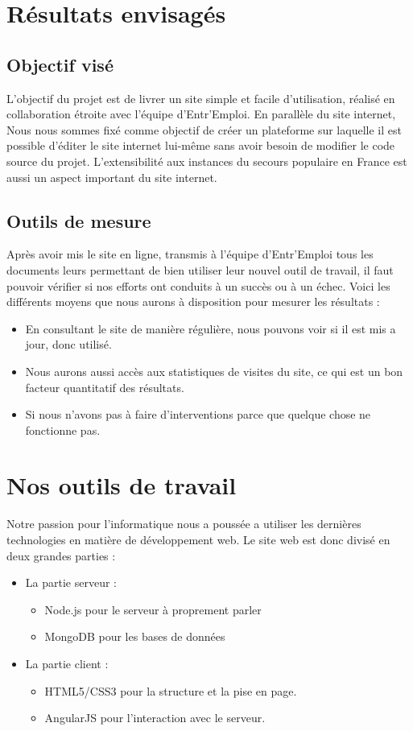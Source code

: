 \documentclass[a4paper, 12pt]{report}
\begin{document}
\chapter{Résultats envisagés}
\thispagestyle{fancy}

\section{Objectif visé}
L'objectif du projet est de livrer un site simple et facile d'utilisation, réalisé en collaboration étroite avec l'équipe d'Entr'Emploi.
En parallèle du site internet, Nous nous sommes fixé comme objectif de créer un plateforme sur laquelle il est possible d'éditer
le site internet lui-même sans avoir besoin de modifier le code source du projet. L'extensibilité aux instances du secours populaire en France
est aussi un aspect important du site internet.

\section{Outils de mesure}
Après avoir mis le site en ligne, transmis à l'équipe d'Entr'Emploi tous les documents leurs permettant de bien utiliser leur nouvel outil de travail, il faut pouvoir vérifier si nos efforts
ont conduits à un succès ou à un échec. Voici les différents moyens que nous aurons à disposition pour mesurer les résultats :
\begin{itemize}
    \item En consultant le site de manière régulière, nous pouvons voir si il est mis a jour, donc utilisé.
    \item Nous aurons aussi accès aux statistiques de visites du site, ce qui est un bon facteur quantitatif des résultats.
    \item Si nous n'avons pas à faire d'interventions parce que quelque chose ne fonctionne pas.
\end{itemize}

\chapter{Nos outils de travail}
\thispagestyle{fancy}

Notre passion pour l'informatique nous a poussée a utiliser les dernières technologies en matière de développement
web.
Le site web est donc divisé en deux grandes parties :
\begin{itemize}
    \item La partie serveur :
    \begin{itemize}
        \item Node.js pour le serveur à proprement parler
        \item MongoDB pour les bases de données
    \end{itemize}
    \item La partie client :
    \begin{itemize}
        \item HTML5/CSS3 pour la structure et la pise en page.
        \item AngularJS pour l'interaction avec le serveur.
    \end{itemize}
\end{itemize}
\end{document}
